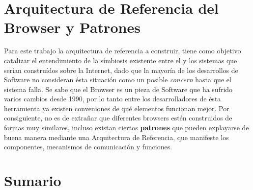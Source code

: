 \section{Arquitectura de Referencia del Browser y Patrones}
\label{chap3:ArqRefBrowandPatt}


Para este trabajo la arquitectura de referencia a construir, tiene como objetivo catalizar el entendimiento de la símbiosis existente entre el \cite{Web Browser} y los sistemas que serían construídos sobre la Internet, dado que la mayoría de los desarrollos de Software no consideran ésta situación como un posible \textit{concern} hasta que el sistema falla. Se sabe que el Browser es un pieza de Software que ha sufrido varios cambios desde 1990, por lo tanto entre los desarrolladores de ésta herramienta ya existen conveniones de qué elementos funcionan mejor. Por consiguiente, no es de extrañar que diferentes browsers estén construidos de formas muy similares, incluso existan ciertos \textbf{patrones} que pueden explayarse de buena manera mediante una Arquitectura de Referencia, que manifeste los componentes, mecanismos de comunicación y funciones.


\section{Sumario}
\label{chap3:Summ}